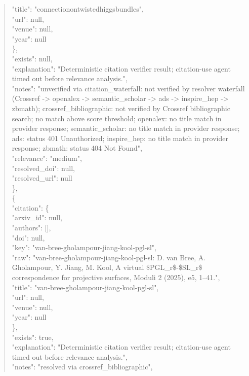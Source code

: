 \documentclass[11pt]{article}
\begin{document}
\begin{quote}
        "title": "connectionontwistedhiggsbundles",\\
        "url": null,\\
        "venue": null,\\
        "year": null\\
      \},\\
      "exists": null,\\
      "explanation": "Deterministic citation verifier result; citation-use agent timed out before relevance analysis.",\\
      "notes": "unverified via citation\_waterfall: not verified by resolver waterfall (Crossref -> openalex -> semantic\_scholar -> ads -> inspire\_hep -> zbmath); crossref\_bibliographic: not verified by Crossref bibliographic search; no match above score threshold; openalex: no title match in provider response; semantic\_scholar: no title match in provider response; ads: status 401 Unauthorized; inspire\_hep: no title match in provider response; zbmath: status 404 Not Found",\\
      "relevance": "medium",\\
      "resolved\_doi": null,\\
      "resolved\_url": null\\
    \},\\
    \{\\
      "citation": \{\\
        "arxiv\_id": null,\\
        "authors": [],\\
        "doi": null,\\
        "key": "van-bree-gholampour-jiang-kool-pgl-sl",\\
        "raw": "van-bree-gholampour-jiang-kool-pgl-sl: D. van Bree, A. Gholampour, Y. Jiang, M. Kool, A virtual \$PGL\_r\$-\$SL\_r\$ correspondence for projective surfaces, Moduli 2 (2025), e5, 1--41.",\\
        "title": "van-bree-gholampour-jiang-kool-pgl-sl",\\
        "url": null,\\
        "venue": null,\\
        "year": null\\
      \},\\
      "exists": true,\\
      "explanation": "Deterministic citation verifier result; citation-use agent timed out before relevance analysis.",\\
      "notes": "resolved via crossref\_bibliographic",\\

\end{quote}
\end{document}
